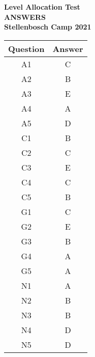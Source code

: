 \documentclass{article}
\begin{document}
\thispagestyle{empty}

\begin{center}
  \textbf{\Large Level Allocation Test}
  \\ \vspace{1em}
  \textbf{\Large ANSWERS}
  \\ \vspace{1em}
  \textbf{\large Stellenbosch Camp 2021}
\end{center}

\vspace{24pt}
\begin{center}
    \begin{tabular}{| c | c |}
        \hline
        Question & Answer \\
        \hline 
        A1 & C\\
        A2 & B\\
        A3 & E\\
        A4 & A\\
        A5 & D\\
        \hline
        C1 & B\\
        C2 & C\\
        C3 & E\\
        C4 & C\\
        C5 & B\\
        \hline
        G1 & C\\
        G2 & E\\
        G3 & B\\
        G4 & A\\
        G5 & A\\
        \hline
        N1 & A\\
        N2 & B\\
        N3 & B\\
        N4 & D\\
        N5 & D\\ 
        \hline
    \end{tabular}
\end{center}
\end{document}
